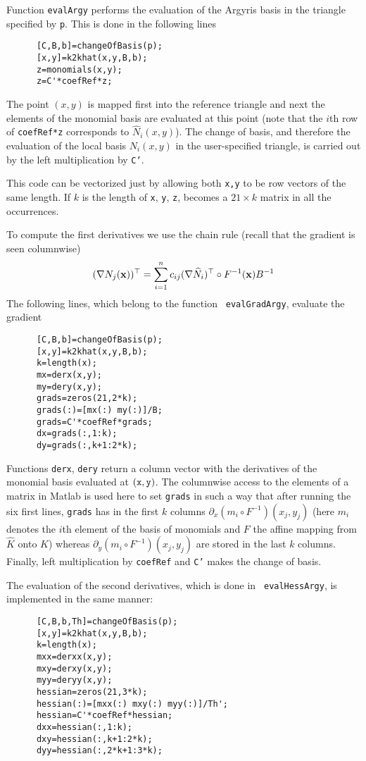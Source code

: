 \documentclass[a4paper,12pt]{article}
\begin{document}
Function {\tt evalArgy} performs the evaluation of the Argyris
basis in the triangle specified by {\tt p}. This is done in the
following lines
\begin{verbatim}
      [C,B,b]=changeOfBasis(p);
      [x,y]=k2khat(x,y,B,b);
      z=monomials(x,y);
      z=C'*coefRef*z;
\end{verbatim}
The point $(x,y)$ is mapped first into the reference triangle and
next the elements of the  monomial basis are evaluated at this point
(note that the $i$th row of {\tt coefRef*z} corresponds to $\widehat
N_i(x,y)$). The change of basis, and therefore the evaluation of the
local basis $N_i(x,y)$ in the user-specified triangle, is carried
out by the left multiplication by {\tt C'}.

This code can be vectorized just by allowing both {\tt x,y} to be
row vectors of the same length. If  $k$ is the length of {\tt x},
{\tt y}, {\tt z}, becomes a $21 \times k$ matrix in all the
occurrences.

To compute the first derivatives we use the chain rule (recall that
the gradient is seen columnwise)
\[
(\nabla N_j({\bf x}))^\top= \sum_{i=1}^n c_{ij} (\nabla
\widehat{N}_i)^\top \circ F^{-1}({\bf x}) B^{-1}
\]
The following lines, which belong to the function {\tt
evalGradArgy}, evaluate the gradient
\begin{verbatim}
      [C,B,b]=changeOfBasis(p);
      [x,y]=k2khat(x,y,B,b);
      k=length(x);
      mx=derx(x,y);
      my=dery(x,y);
      grads=zeros(21,2*k);
      grads(:)=[mx(:) my(:)]/B;
      grads=C'*coefRef*grads;
      dx=grads(:,1:k);
      dy=grads(:,k+1:2*k);
\end{verbatim}
Functions {\tt derx}, {\tt dery} return a column vector with the
derivatives of the monomial basis evaluated at $({\tt x},{\tt y})$.
The columnwise access to the elements of a matrix in Matlab is used
here to set {\tt grads} in such a way that after running  the six
first lines, {\tt grads} has in the first  $k$ columns
$\partial_x(m_i\circ F^{-1})(x_j,y_j)$ (here $m_{i}$ denotes the
$i$th element of the basis of monomials and $F$ the affine mapping
from $\widehat{K}$ onto $K$) whereas $\partial_y(m_i\circ
F^{-1})(x_j,y_j)$ are stored in the last $k$ columns.  Finally,
left multiplication by {\tt coefRef} and {\tt C'} makes the change of
basis.


The evaluation of the second derivatives, which is done in {\tt
evalHessArgy}, is implemented in the same manner:
\begin{verbatim}
      [C,B,b,Th]=changeOfBasis(p);
      [x,y]=k2khat(x,y,B,b);
      k=length(x);
      mxx=derxx(x,y);
      mxy=derxy(x,y);
      myy=deryy(x,y);
      hessian=zeros(21,3*k);
      hessian(:)=[mxx(:) mxy(:) myy(:)]/Th';
      hessian=C'*coefRef*hessian;
      dxx=hessian(:,1:k);
      dxy=hessian(:,k+1:2*k);
      dyy=hessian(:,2*k+1:3*k);
\end{verbatim}
\end{document}
